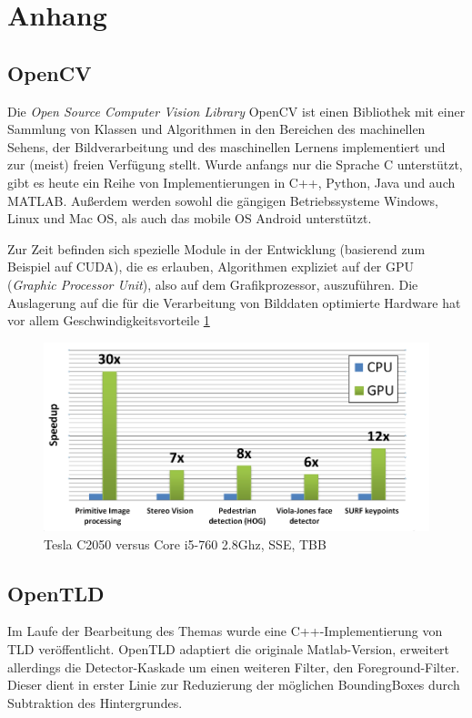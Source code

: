 \section{Anhang}
\subsection*{OpenCV}
Die \textit{Open Source Computer Vision Library} OpenCV ist einen Bibliothek mit einer Sammlung von Klassen und Algorithmen in den Bereichen des machinellen Sehens, der Bildverarbeitung und des maschinellen Lernens implementiert und zur (meist) freien Verfügung stellt. Wurde anfangs nur die Sprache C unterstützt, gibt es heute ein Reihe von Implementierungen in C++, Python, Java und auch MATLAB. Außerdem werden sowohl die gängigen Betriebssysteme Windows, Linux und Mac OS, als auch das mobile OS Android unterstützt.

Zur Zeit befinden sich spezielle Module in der Entwicklung (basierend zum Beispiel auf CUDA), die es erlauben, Algorithmen expliziet auf der GPU (\textit{Graphic Processor Unit}), also auf dem Grafikprozessor, auszuführen. Die Auslagerung auf die für die Verarbeitung von Bilddaten optimierte Hardware hat vor allem Geschwindigkeitsvorteile \ref{GPU_Performance}

\begin{figure}
\centering{}\includegraphics[scale=0.5]{../pictures/GPU_Performance.png}\caption{Tesla C2050 versus Core i5-760 2.8Ghz, SSE, TBB \cite{OCW}}
\label{GPU_Performance}
\end{figure}

\subsection*{OpenTLD}
Im Laufe der Bearbeitung des Themas wurde eine C++-Implementierung von TLD veröffentlicht. OpenTLD adaptiert die originale Matlab-Version, erweitert allerdings die Detector-Kaskade um einen weiteren Filter, den Foreground-Filter. Dieser dient in erster Linie zur Reduzierung der möglichen BoundingBoxes durch Subtraktion des Hintergrundes.


